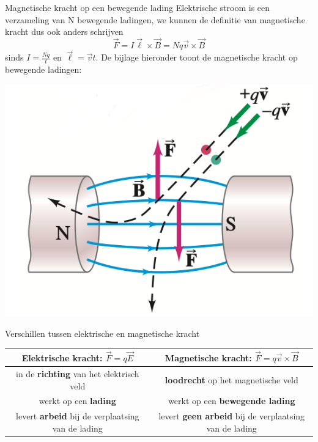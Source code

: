 \begin{theo}{Magnetische kracht op een bewegende lading}
    Elektrische stroom is een verzameling van N bewegende ladingen, we kunnen de definitie van magnetische kracht dus ook anders schrijven
    \begin{equation*}
        \Vec{F} = I\Vec{\ell} \times \Vec{B} = Nq\Vec{v} \times \Vec{B}
    \end{equation*}
    sinds $I = \tfrac{Nq}{t}$ en $\Vec{\ell} = \Vec{v}t$. De bijlage hieronder toont de magnetische kracht op bewegende ladingen:
    \begin{center}
        \includegraphics[scale=0.25]{Images/Magnetisme/MagnetischeKrachtOpBewgendeLading}
    \end{center}
\end{theo}

\begin{vrg}{Verschillen tussen elektrische en magnetische kracht}
    \vspace{-0.3cm}
    \def\arraystretch{2}
    \hspace{-0.35cm}
    \begin{tabular}{c|c}
        Elektrische kracht: $\Vec{F} = q\Vec{E}$ & Magnetische kracht: $\Vec{F} = q\Vec{v} \times \Vec{B}$ \\ \hline
        in de \textbf{richting} van het elektrisch veld & \textbf{loodrecht} op het magnetische veld \\
        werkt op een \textbf{lading} & werkt op een \textbf{bewegende lading} \\
        levert \textbf{arbeid} bij de verplaatsing van de lading & levert \textbf{geen arbeid} bij de verplaatsing van de lading \\
    \end{tabular}
\end{vrg}

